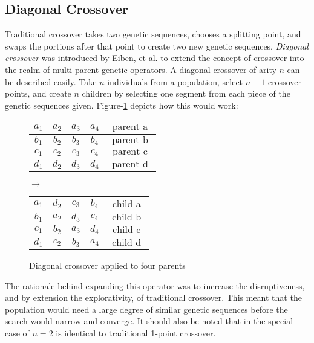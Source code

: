 \subsection*{Diagonal Crossover}
Traditional crossover takes two genetic sequences, chooses a splitting point, and swaps the portions after that point to create two new genetic sequences. \emph{Diagonal crossover} was introduced by Eiben, et al. to extend the concept of crossover into the realm of multi-parent genetic operators\cite{Eiben03}. A diagonal crossover of arity $n$ can be described easily. Take $n$ individuals from a population, select $n-1$ crossover points, and create $n$ children by selecting one segment from each piece of the genetic sequences given\cite{Eiben95}. Figure-\ref{DC-Fig} depicts how this would work\cite{Eiben95}:
\begin{figure}[h!]
\centering
\begin{tabular}{ | c | c | c | c | c | }
\hline
$a_1$ & $a_2$ & $a_3$ & $a_4$ & $\text{ parent a }$ 	\\ \hline
$b_1$ & $b_2$ & $b_3$ & $b_4$ & $\text{ parent b }$ 	\\ \hline
$c_1$ & $c_2$ & $c_3$ & $c_4$ & $\text{ parent c }$ 	\\ \hline
$d_1$ & $d_2$ & $d_3$ & $d_4$ & $\text{ parent d }$ 	\\ \hline
\end{tabular}
$\rightarrow$
\begin{tabular}{ | c | c | c | c | c | }
\hline
$a_1$ & $d_2$ & $c_3$ & $b_4$ & $\text{ child a }$ 	\\ \hline
$b_1$ & $a_2$ & $d_3$ & $c_4$ & $\text{ child b }$ 	\\ \hline
$c_1$ & $b_2$ & $a_3$ & $d_4$ & $\text{ child c }$ 	\\ \hline
$d_1$ & $c_2$ & $b_3$ & $a_4$ & $\text{ child d }$ 	\\ \hline
\end{tabular}
\caption{Diagonal crossover applied to four parents}
\label{DC-Fig}
\end{figure} 

The rationale behind expanding this operator was to increase the disruptiveness, and by extension the explorativity, of traditional crossover\cite{Eiben97}. This meant that the population would need a large degree of similar genetic sequences before the search would narrow and converge\cite{Eiben95}. It should also be noted that in the special case of $n = 2$ is identical to traditional 1-point crossover\cite{Eiben95}.